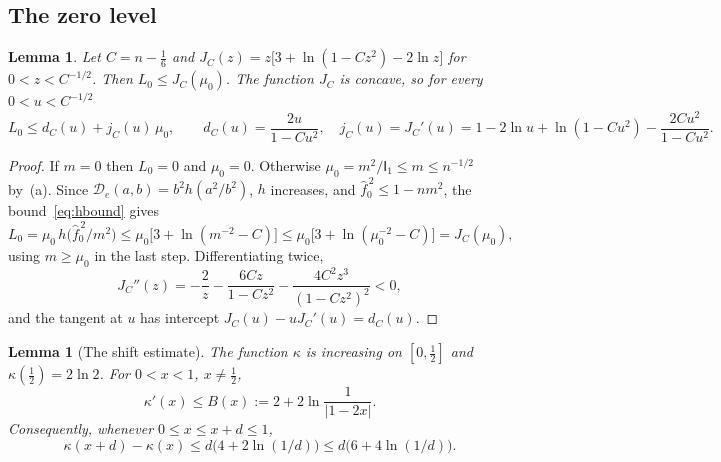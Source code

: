 \documentclass[11pt]{amsart}
\newtheorem{lemma}[theorem]{Lemma}
\theoremstyle{definition}
\theoremstyle{remark}
\newcommand{\I}{\mathsf I}
\newcommand{\wh}[1]{\widehat{#1}}
\begin{document}
\subsection{The zero level}
\begin{lemma}\label{lem:zero}
Let $C=n-\frac16$ and $J_C(z)=z\bigl[3+\ln(1-Cz^2)-2\ln z\bigr]$ for $0<z<C^{-1/2}$. Then $L_0\le J_C(\mu_0)$. The function $J_C$ is concave, so for every $0<u<C^{-1/2}$
\[
 L_0\le d_C(u)+j_C(u)\,\mu_0,\qquad d_C(u)=\frac{2u}{1-Cu^2},\quad j_C(u)=J_C'(u)=1-2\ln u+\ln(1-Cu^2)-\frac{2Cu^2}{1-Cu^2}.
\]
\end{lemma}

\begin{proof}
If $m=0$ then $L_0=0$ and $\mu_0=0$. Otherwise $\mu_0=m^2/\I_1\le m\le n^{-1/2}$ by~(a). Since $\mathcal D_e(a,b)=b^2h(a^2/b^2)$, $h$ increases, and $\wh f_0^{\,2}\le1-nm^2$, the bound~\eqref{eq:hbound} gives
\[
 L_0=\mu_0\,h\bigl(\wh f_0^{\,2}/m^2\bigr)\le\mu_0\bigl[3+\ln(m^{-2}-C)\bigr]\le\mu_0\bigl[3+\ln(\mu_0^{-2}-C)\bigr]=J_C(\mu_0),
\]
using $m\ge\mu_0$ in the last step. Differentiating twice,
\[
 J_C''(z)=-\frac2z-\frac{6Cz}{1-Cz^2}-\frac{4C^2z^3}{(1-Cz^2)^2}<0,
\]
and the tangent at $u$ has intercept $J_C(u)-uJ_C'(u)=d_C(u)$.
\end{proof}

\begin{lemma}[The shift estimate]\label{lem:shift}
The function $\kappa$ is increasing on $[0,\frac12]$ and $\kappa(\frac12)=2\ln2$. For $0<x<1$, $x\ne\frac12$,
\begin{equation}\label{eq:sharpderivative}
 \kappa'(x)\le B(x):=2+2\ln\frac1{|1-2x|}.
\end{equation}
Consequently, whenever $0\le x\le x+d\le1$,
\[
 \kappa(x+d)-\kappa(x)\le d\bigl(4+2\ln(1/d)\bigr)
 \le d\bigl(6+4\ln(1/d)\bigr).
\]
\end{lemma}
\end{document}
